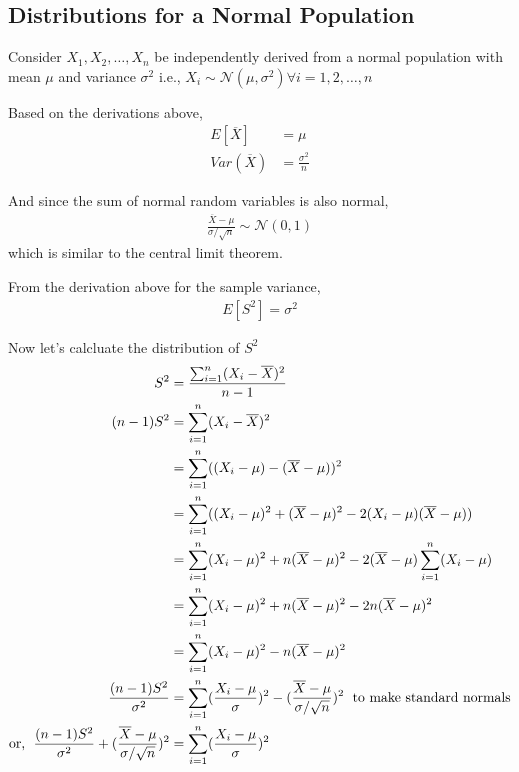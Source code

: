 \documentclass[../probability-notes.tex]{subfiles}
\begin{document}
    
    \subsection{Distributions for a Normal Population}
    Consider $X_{1}, X_{2}, \ldots, X_{n}$ be independently derived from a normal population with mean $\mu$ and variance $\sigma^{2}$\newline
    i.e., $X_{i} \sim \mathcal{N}(\mu, \sigma^{2}) \forall i = 1, 2, \ldots, n$ \newline

    Based on the derivations above,
    \begin{align*}
        E[\overline{X}] &= \mu\\
        Var(\overline{X}) &= \frac{\sigma^{2}}{n}
    \end{align*}

    And since the sum of normal random variables is also normal,
    \begin{align*}
        \frac{\overline{X} - \mu}{\sigma/\sqrt{n}} \sim \mathcal{N}(0, 1)
    \end{align*}
    which is similar to the central limit theorem.\newline

    From the derivation above for the sample variance,
    \begin{align*}
        E[S^{2}] = \sigma^{2}
    \end{align*}

    Now let's calcluate the distribution of $S^{2}$
    \begin{align*}
        S^{2} &= \frac{\sum_{i=1}^{n} (X_{i} - \overline{X})^{2}}{n-1}\\
        (n-1)S^{2} &= \sum_{i=1}^{n} (X_{i} - \overline{X})^{2}\\
        &= \sum_{i=1}^{n} ((X_{i} - \mu) - (\overline{X} - \mu))^{2}\\
        &= \sum_{i=1}^{n} ((X_{i} - \mu)^{2} + (\overline{X} - \mu)^{2} - 2(X_{i} - \mu)(\overline{X} - \mu))\\
        &= \sum_{i=1}^{n} (X_{i} - \mu)^{2} + n(\overline{X} - \mu)^{2} - 2(\overline{X} - \mu)\sum_{i=1}^{n}(X_{i} - \mu)\\
        &= \sum_{i=1}^{n} (X_{i} - \mu)^{2} + n(\overline{X} - \mu)^{2} - 2n(\overline{X} - \mu)^{2}\\
        &= \sum_{i=1}^{n} (X_{i} - \mu)^{2} - n(\overline{X} - \mu)^{2}\\
        \frac{(n-1)S^{2}}{\sigma^{2}} &= \sum_{i=1}^{n} (\frac{X_{i} - \mu}{\sigma})^{2} - (\frac{\overline{X} - \mu}{\sigma/\sqrt{n}})^{2} \text{\; to make standard normals}\\
        \text{or, \;} \frac{(n-1)S^{2}}{\sigma^{2}} + (\frac{\overline{X} - \mu}{\sigma/\sqrt{n}})^{2} &= \sum_{i=1}^{n} (\frac{X_{i} - \mu}{\sigma})^{2}
    \end{align*}
\end{document}
